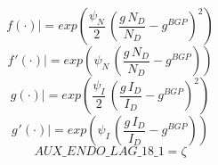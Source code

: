 \documentclass[10pt,a4paper]{article}
\begin{document}
\begin{dmath}
{\left.       f\left( \cdot \right)            \right|}=exp\left(\frac{\psi_N}{2}\, \left(\frac{{g}\, {N_D}}{{N_D}}-g^{BGP}\right)^{2}\right)
\end{dmath}
\begin{dmath}
{\left.       f^‎{\prime}\left( \cdot \right)   \right|}=exp\left(\psi_N\, \left(\frac{{g}\, {N_D}}{{N_D}}-g^{BGP}\right)\right)
\end{dmath}
\begin{dmath}
{\left.       g\left( \cdot \right)            \right|}=exp\left(\frac{\psi_I}{2}\, \left(\frac{{g}\, {I_D}}{{I_D}}-g^{BGP}\right)^{2}\right)
\end{dmath}
\begin{dmath}
{\left.       g^‎{\prime}\left( \cdot \right)   \right|}=exp\left(\psi_I\, \left(\frac{{g}\, {I_D}}{{I_D}}-g^{BGP}\right)\right)
\end{dmath}
\begin{dmath}
AUX\_ENDO\_LAG\_18\_1={\zeta}
\end{dmath}
\end{document}
